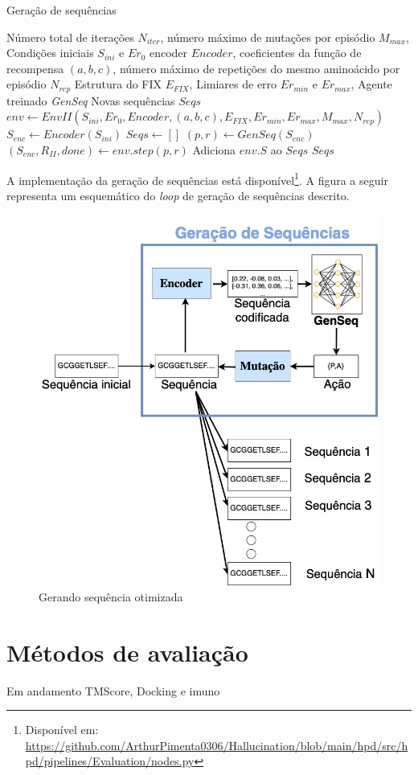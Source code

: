\begin{algorithm}[H]
  \caption{Geração de sequências}
  \label{alg:gerseq}
  \begin{algorithmic}[1]
  \Require Número total de iterações $N_{iter}$, %
  \State         número máximo de mutações por episódio $M_{max}$, %
  \State         Condições iniciais $S_{ini}$ e $Er_{0}$
  \State         encoder $Encoder$,
  \State         coeficientes da função de recompensa $(a, b, c)$,
  \State         número máximo de repetições do mesmo aminoácido por episódio $N_{rep}$
  \State         Estrutura do FIX $E_{FIX}$, 
  \State         Limiares de erro $Er_{min}$ e $Er_{max}$, %
  \State         Agente treinado \textit{GenSeq}
  \Ensure Novas sequências $Seqs$
  \State $env \gets EnvII(S_{ini}, Er_{0}, Encoder, (a, b, c), E_{FIX}, Er_{min},Er_{max}, M_{max}, N_{rep})$ 
  \State $S_{enc} \gets Encoder(S_{ini})$ 
  \State $Seqs \gets []$ 
      \State $(p,r) \gets GenSeq(S_{enc})$ 
      \State $(S_{enc}, R_{II}, done) \gets env.step(p, r)$ 
      \State Adiciona $env.S$ ao $Seqs$ 
  \EndFor
  \State \Return $Seqs$
  \end{algorithmic}
\end{algorithm}

A implementação da geração de sequências está disponível\footnote{Disponível em: \url{https://github.com/ArthurPimenta0306/Hallucination/blob/main/hpd/src/hpd/pipelines/Evaluation/nodes.py}}.
A figura a seguir representa um esquemático do \textit{loop} de geração de sequências descrito.

\begin{figure}[H]
  \centering
  \includegraphics[width=.8\textwidth]{figuras/metodologia-Generating.jpg}
  \caption{Gerando sequência otimizada}
  \label{fig:geradorseq}
\end{figure}


\section{Métodos de avaliação}
{\color{red} Em andamento}
{\color{red} TMScore, Docking e imuno}

